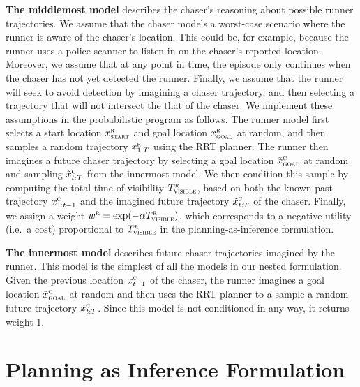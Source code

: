 \documentclass{article}
\begin{document}
\textbf{The middlemost model} describes the chaser's reasoning about possible runner trajectories. %
We assume that the chaser models a worst-case scenario where the runner is aware of the chaser's location. This could be, for example, because the runner uses a police scanner to listen in on the chaser's reported location.
Moreover, we assume that at any point in time, the episode only continues when the chaser has not yet detected the runner. Finally, we assume that the runner will seek to avoid detection by imagining a chaser trajectory, and then selecting a trajectory that will not intersect the that of the chaser. We implement these assumptions in the probabilistic program as follows. The runner model first selects a start location $x^\textsc{r}_\textsc{start}$ and goal location $x^\textsc{r}_\textsc{goal}$ at random, and then samples a random trajectory $x^\textsc{r}_{1:T}$ using the RRT planner. The runner then imagines a future chaser trajectory by selecting a goal location $\tilde{x}^\textsc{c}_\textsc{goal}$ at random and sampling $\tilde{x}^\textsc{c}_{t:T}$ from the innermost model. We then condition this sample by computing the total time of visibility $T^\textsc{r}_\textsc{visible}$, based on both the known past trajectory $x^\textsc{c}_{1:t-1}$ and the imagined future trajectory $\tilde{x}^\textsc{c}_{t:T}$ of the chaser. Finally, we assign a weight $w^\textsc{r} = \exp(-\alpha T^\textsc{r}_\textsc{visible})$, which corresponds to a negative utility (i.e.~a cost) proportional to $T^\textsc{r}_\textsc{visible}$ in the planning-as-inference formulation.

\textbf{The innermost model} describes future chaser trajectories imagined by the runner. This model is the simplest of all the models in our nested formulation. Given the previous location $x^\textsc{c}_{t-1}$ of the chaser, the runner imagines a goal location $\tilde{x}^\textsc{c}_\textsc{goal}$ at random and then uses the RRT planner to a sample a random future trajectory $\tilde{x}^\textsc{c}_{t:T}$. Since this model is not conditioned in any way, it returns weight 1.

\section{Planning as Inference Formulation}
\end{document}
